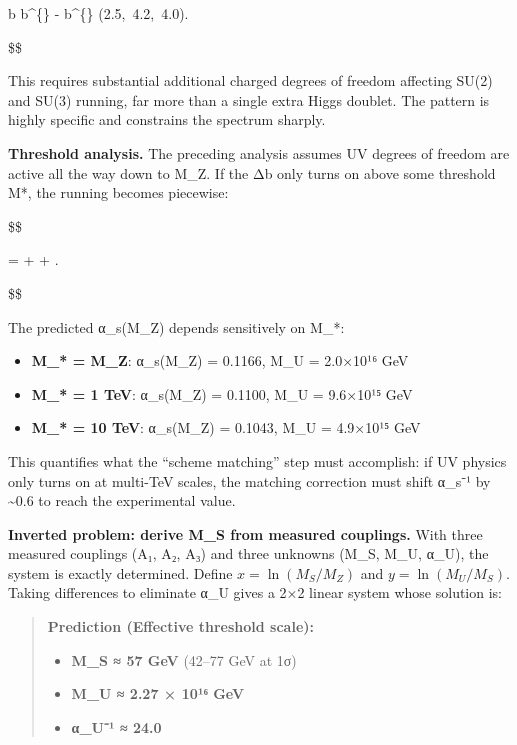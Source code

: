 \documentclass[11pt,a4paper]{article}
\theoremstyle{remark}
\providecommand{\tightlist}{%
  \setlength{\itemsep}{0pt}\setlength{\parskip}{0pt}}
\begin{document}
\Delta b \equiv b\^{}\{\} - b\^{}\{\} \approx (2.5,~4.2,~4.0).

\$\$

This requires substantial additional charged degrees of freedom affecting
SU(2) and SU(3) running, far more than a single extra Higgs doublet.
The pattern is highly specific and constrains the spectrum sharply.

\textbf{Threshold analysis.} The preceding analysis assumes UV degrees of freedom
are active all the way down to M\_Z. If the Δb only turns on above
some threshold M*, the running becomes piecewise:

\$\$

 =  + 
\ln{} + \ln{}.

\$\$

The predicted α\_s(M\_Z) depends sensitively on M\_*:

\begin{itemize}
\tightlist
\item
  \textbf{M\_* = M\_Z}: α\_s(M\_Z) = 0.1166, M\_U = 2.0×10¹⁶ GeV
\item
  \textbf{M\_* = 1 TeV}: α\_s(M\_Z) = 0.1100, M\_U = 9.6×10¹⁵ GeV
\item
  \textbf{M\_* = 10 TeV}: α\_s(M\_Z) = 0.1043, M\_U = 4.9×10¹⁵ GeV
\end{itemize}

This quantifies what the ``scheme matching'' step must accomplish: if UV physics
only turns on at multi-TeV scales, the matching correction must shift
α\_s⁻¹ by \textasciitilde0.6 to reach the experimental value.

\textbf{Inverted problem: derive M\_S from measured couplings.} With three measured
couplings (A₁, A₂, A₃) and three unknowns (M\_S, M\_U, α\_U), the
system is exactly determined. Define \(x = \ln(M_S/M_Z)\) and
\(y = \ln(M_U/M_S)\). Taking differences to eliminate α\_U gives a 2×2
linear system whose solution is:

\begin{quote}
\textbf{Prediction (Effective threshold scale):}

\begin{itemize}
\tightlist
\item
  \textbf{M\_S ≈ 57 GeV} (42--77 GeV at 1σ)
\item
  \textbf{M\_U ≈ 2.27 × 10¹⁶ GeV}
\item
  \textbf{α\_U⁻¹ ≈ 24.0}
\end{itemize}
\end{quote}
\end{document}
